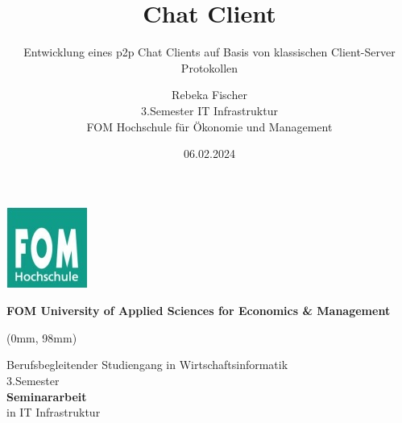 \documentclass[
    a4paper
    DIV=12, 
    bibliography=totoc,
    listof=totoc
]{scrartcl}
\title{\textbf{\huge{Chat Client}}}
\subtitle{\Large{Entwicklung eines p2p Chat Clients auf Basis von klassischen Client-Server Protokollen}}
\author{Rebeka Fischer \\ 3.Semester  IT Infrastruktur \\ FOM Hochschule für Ökonomie und Management}
\date{06.02.2024}
\begin{document}
\makeatletter
\thispagestyle{empty}
\begin{titlepage}{

    \begin{center}
        \includegraphics[scale=1]{Images/FOM-Logo.jpg}

        \vspace{10mm}
        \textbf{\huge{FOM University of Applied Sciences for Economics \& Management}}
    \end{center}


        
    \begin{textblock*}{\paperwidth} (0mm, 98mm)  %
        \begin{center}
            Berufsbegleitender Studiengang in Wirtschaftsinformatik \\
            3.Semester \\
            \vspace{10mm}
            \textbf{Seminararbeit} \\
            in IT Infrastruktur \\
            \vspace{10mm}
            \@title \\
            \vspace{2mm}
            \@subtitle \\
            \vspace{10mm}
            \fontsize{15pt}{15pt}\selectfont
            \@author
        \end{center}
    \end{textblock*}

        
    
}\end{titlepage}
\

\newpage
\setcounter{page}{1}
\tableofcontents
\newpage
\listoffigures
\newpage


\newpage



\newpage



\end{document}
